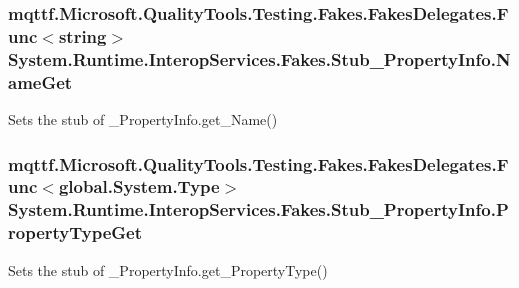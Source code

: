 \hypertarget{class_system_1_1_runtime_1_1_interop_services_1_1_fakes_1_1_stub___property_info_a4e913fa0b8c857fc0f325940de02c8a7}{
\subsubsection[{Name\-Get}]{\setlength{\rightskip}{0pt plus 5cm}mqttf.\-Microsoft.\-Quality\-Tools.\-Testing.\-Fakes.\-Fakes\-Delegates.\-Func$<$string$>$ System.\-Runtime.\-Interop\-Services.\-Fakes.\-Stub\-\_\-\-Property\-Info.\-Name\-Get}}\label{class_system_1_1_runtime_1_1_interop_services_1_1_fakes_1_1_stub___property_info_a4e913fa0b8c857fc0f325940de02c8a7}


Sets the stub of \-\_\-\-Property\-Info.\-get\-\_\-\-Name()

\hypertarget{class_system_1_1_runtime_1_1_interop_services_1_1_fakes_1_1_stub___property_info_a54e408ad7b1b8b13c7aa74d246817c31}{
\subsubsection[{Property\-Type\-Get}]{\setlength{\rightskip}{0pt plus 5cm}mqttf.\-Microsoft.\-Quality\-Tools.\-Testing.\-Fakes.\-Fakes\-Delegates.\-Func$<$global.\-System.\-Type$>$ System.\-Runtime.\-Interop\-Services.\-Fakes.\-Stub\-\_\-\-Property\-Info.\-Property\-Type\-Get}}\label{class_system_1_1_runtime_1_1_interop_services_1_1_fakes_1_1_stub___property_info_a54e408ad7b1b8b13c7aa74d246817c31}


Sets the stub of \-\_\-\-Property\-Info.\-get\-\_\-\-Property\-Type()


